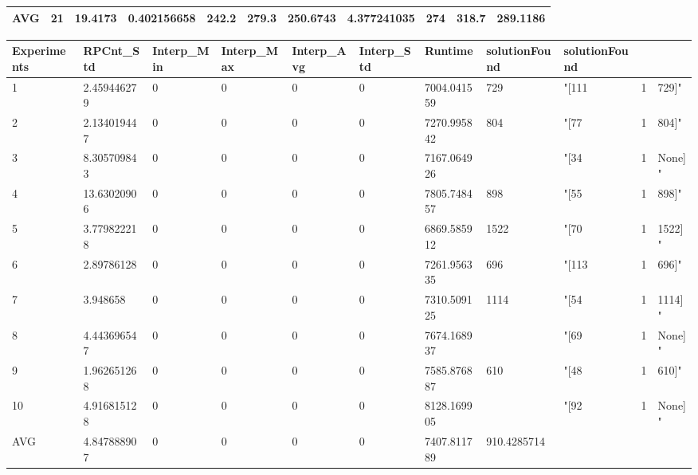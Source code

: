 \begin{table}[H]
\begin{adjustbox}{max width=380pt,keepaspectratio,angle=90}
\begin{tabular}{|l|l|l|l|l|l|l|l|l|l|l|}
				AVG         & 21           & 19.4173      & 0.402156658  & 242.2      & 279.3      & 250.6743   & 4.377241035 & 274        & 318.7      & 289.1186   \\ \hline
			\end{tabular}
		\end{adjustbox}
		\begin{adjustbox}{max width=340pt,keepaspectratio,angle=90}
			\begin{tabular}{|l|l|l|l|l|l|l|l|l|l|l|}
				\hline
				\rowcolor[HTML]{EFEFEF} 
				Experiments & RPCnt\_Std  & Interp\_Min & Interp\_Max & Interp\_Avg & Interp\_Std & Runtime     & solutionFound & solutionFound &   &          \\ \hline
				1           & 2.459446279 & 0           & 0           & 0           & 0           & 7004.041559 & 729           & "{[}111       & 1 & 729{]}"  \\ \hline
				2           & 2.134019447 & 0           & 0           & 0           & 0           & 7270.995842 & 804           & "{[}77        & 1 & 804{]}"  \\ \hline
				3           & 8.305709843 & 0           & 0           & 0           & 0           & 7167.064926 &               & "{[}34        & 1 & None{]}" \\ \hline
				4           & 13.63020906 & 0           & 0           & 0           & 0           & 7805.748457 & 898           & "{[}55        & 1 & 898{]}"  \\ \hline
				5           & 3.779822218 & 0           & 0           & 0           & 0           & 6869.585912 & 1522          & "{[}70        & 1 & 1522{]}" \\ \hline
				6           & 2.89786128  & 0           & 0           & 0           & 0           & 7261.956335 & 696           & "{[}113       & 1 & 696{]}"  \\ \hline
				7           & 3.948658    & 0           & 0           & 0           & 0           & 7310.509125 & 1114          & "{[}54        & 1 & 1114{]}" \\ \hline
				8           & 4.443696547 & 0           & 0           & 0           & 0           & 7674.168937 &               & "{[}69        & 1 & None{]}" \\ \hline
				9           & 1.962651268 & 0           & 0           & 0           & 0           & 7585.876887 & 610           & "{[}48        & 1 & 610{]}"  \\ \hline
				10          & 4.916815128 & 0           & 0           & 0           & 0           & 8128.169905 &               & "{[}92        & 1 & None{]}" \\ \hline
				AVG         & 4.847888907 & 0           & 0           & 0           & 0           & 7407.811789 & 910.4285714   &               &   &          \\ \hline
			\end{tabular}
		\end{adjustbox}	
	\end{table}
			
